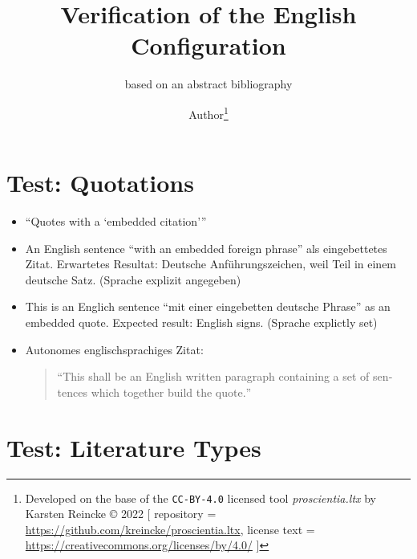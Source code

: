 \documentclass[
  DIV=calc,
  BCOR=5mm,
  11pt,
  headings=small,
  oneside,
  abstract=true,
  toc=bib,
  ngerman,english]{scrartcl}
\begin{document}
\nocite{*}

\titlehead{Bib\LaTeX}
\subject{Release 1.0}
\title{Verification of the English Configuration}
\subtitle{based on an abstract bibliography}
\author{Author\footnote{
Developed on the base of the \texttt{CC-BY-4.0} licensed tool \textit{proscientia.ltx} by Karsten Reincke \copyright{} 2022 [
repository = \href{https://github.com/kreincke/proscientia.ltx}{https://github.com/kreincke/proscientia.ltx},
license text = \href{https://creativecommons.org/licenses/by/4.0/}{https://creativecommons.org/licenses/by/4.0/} ]}
}


\maketitle

\footnotesize
\tableofcontents

\normalsize
\section{Test: Quotations}
\begin{itemize}

  \item \enquote{Quotes with a \enquote{embedded citation}}

  \item An English sentence \foreignquote{german}{with an embedded foreign phrase} als eingebettetes Zitat. Erwartetes Resultat: Deutsche Anführungszeichen, weil Teil in einem deutsche Satz. (Sprache explizit angegeben)

  \item This is an Englich sentence \foreignquote{english}{mit einer eingebetten deutsche Phrase} as an embedded quote. Expected result: English signs. (Sprache explictly set)

  \item Autonomes englischsprachiges Zitat:
  \begin{quote}\foreignquote{english}{This shall be an English written paragraph containing a set of sentences which together build the quote.}\end{quote}

\end{itemize}

\section{Test: Literature Types}
\end{document}
